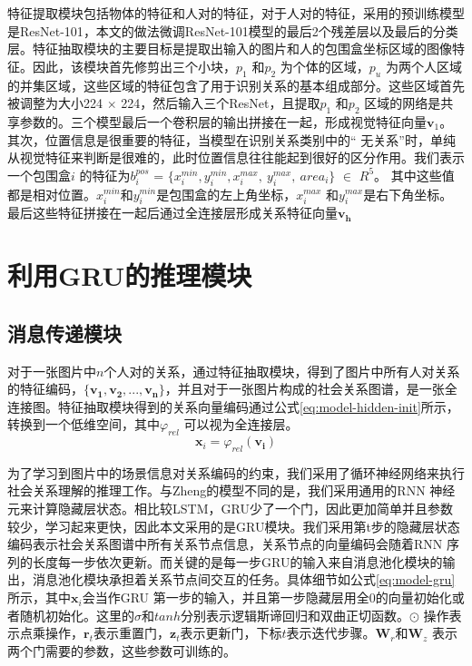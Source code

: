 特征提取模块包括物体的特征和人对的特征，对于人对的特征，采用的预训练模型是ResNet-101\cite{he2016deep}，本文的做法微调ResNet-101模型的最后2个残差层以及最后的分类层。特征抽取模块的主要目标是提取出输入的图片和人的包围盒坐标区域的图像特征。因此，该模块首先修剪出三个小块，$p_1$ 和$p_2$ 为个体的区域，$p_{u}$ 为两个人区域的并集区域，这些区域的特征包含了用于识别关系的基本组成部分。这些区域首先被调整为大小224 $\times$ 224，然后输入三个ResNet，且提取$p_1$ 和$p_2$ 区域的网络是共享参数的。三个模型最后一个卷积层的输出拼接在一起，形成视觉特征向量$\mathbf{v}_1$。 其次，位置信息是很重要的特征，当模型在识别关系类别中的`` 无关系''时，单纯从视觉特征来判断是很难的，此时位置信息往往能起到很好的区分作用。我们表示一个包围盒$i$ 的特征为$b_i^{pos}$ = $\{ x_{i}^{min}, y_{i}^{min}, x_{i}^{max}, ~y_{i}^{max},~ area_{i} \}$ $\in$ $R^5$。 其中这些值都是相对位置。$x_{i}^{min}$和$y_{i}^{min}$是包围盒的左上角坐标，$x_{i}^{max}$ 和$y_{i}^{max}$是右下角坐标。最后这些特征拼接在一起后通过全连接层形成关系特征向量$\mathbf{v_h}$


\section{利用GRU的推理模块}

\subsection{消息传递模块}
对于一张图片中$n$个人对的关系，通过特征抽取模块，得到了图片中所有人对关系的特征编码，$\{ \mathbf{v_{1}},\mathbf{v_{2}},...,\mathbf{v_{n}} \}$，并且对于一张图片构成的社会关系图谱，是一张全连接图。特征抽取模块得到的关系向量编码通过公式\ref{eq:model-hidden-init}所示，转换到一个低维空间，其中$ \varphi_{rel} $ 可以视为全连接层。
\begin{equation} \label{eq:model-hidden-init}
    \mathbf{x}_{i} = \varphi_{rel} (\mathbf{v_{i}})
\end{equation}

为了学习到图片中的场景信息对关系编码的约束，我们采用了循环神经网络来执行社会关系理解的推理工作。与Zheng\cite{zheng2015conditional}的模型不同的是，我们采用通用的RNN 神经元来计算隐藏层状态。相比较LSTM，GRU少了一个门，因此更加简单并且参数较少，学习起来更快，因此本文采用的是GRU模块。我们采用第t步的隐藏层状态编码表示社会关系图谱中所有关系节点信息，关系节点的向量编码会随着RNN 序列的长度每一步依次更新。而关键的是每一步GRU的输入来自消息池化模块的输出，消息池化模块承担着关系节点间交互的任务。具体细节如公式\ref{eq:model-gru}所示，其中$\mathbf{x}_i$会当作GRU 第一步的输入，并且第一步隐藏层用全0的向量初始化或者随机初始化。这里的$\sigma$和$tanh$分别表示逻辑斯谛回归和双曲正切函数。$\odot$ 操作表示点乘操作，$\bm{r}_t$表示重置门，$\bm{z}_t$表示更新门，下标$t$表示迭代步骤。$\mathbf{W}_r$和$\mathbf{W}_z$ 表示两个门需要的参数，这些参数可训练的。

